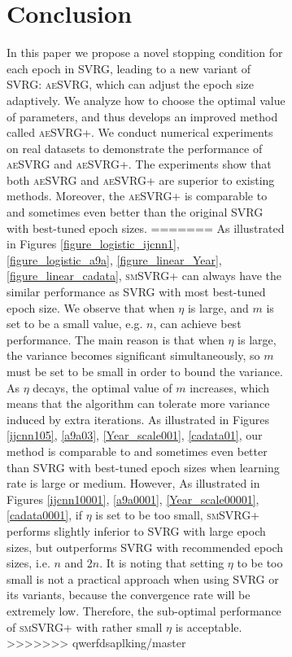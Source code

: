 \documentclass[conference]{IEEEtran}
\begin{document}
\begin{algorithm}[t]
\begin{itemize}
\begin{figure}[ht]
\begin{figure}[ht]
\section{Conclusion}
In this paper we propose a novel stopping condition for each epoch in SVRG, leading to a new variant of SVRG: \textsc{aeSVRG}, which can adjust the epoch size adaptively. We analyze how to choose the optimal value of parameters, and thus develops an improved method called \textsc{aeSVRG+}. We conduct numerical experiments on real datasets to demonstrate the performance of \textsc{aeSVRG} and \textsc{aeSVRG+}. The experiments show that both \textsc{aeSVRG} and \textsc{aeSVRG+} are superior to existing methods. Moreover, the \textsc{aeSVRG+} is comparable to and sometimes even better than the original SVRG with best-tuned epoch sizes.
=======
As illustrated in Figures \ref{figure_logistic_ijcnn1}, \ref{figure_logistic_a9a}, \ref{figure_linear_Year}, \ref{figure_linear_cadata},  \textsc{smSVRG+} can always have the similar performance as SVRG with most best-tuned epoch size. We observe that when $\eta$ is large,  and $m$ is set to be a small value, e.g. $n$, can achieve best performance. The main reason is that when $\eta$ is large, the variance becomes significant simultaneously, so $m$ must be set to be small in order to bound the variance. As $\eta$ decays, the optimal value of $m$ increases, which means that the algorithm can tolerate more variance induced by extra iterations. As illustrated in Figures \ref{ijcnn105}, \ref{a9a03}, \ref{Year_scale001}, \ref{cadata01}, our method is comparable to and sometimes even better than SVRG with best-tuned epoch sizes when learning rate is large or medium. However, As illustrated in Figures \ref{ijcnn10001}, \ref{a9a0001}, \ref{Year_scale00001}, \ref{cadata0001}, if $\eta$ is set to be too small, \textsc{smSVRG+} performs slightly inferior to  SVRG with large epoch sizes, but outperforms SVRG with recommended epoch sizes, i.e. $n$ and $2n$. It is noting that setting $\eta$ to be too small is not a practical approach when using SVRG or its variants, because the convergence rate will be extremely low. Therefore, the sub-optimal performance of \textsc{smSVRG+} with rather small $\eta$ is acceptable.
>>>>>>> qwerfdsaplking/master
 

\end{figure}
\end{figure}
\end{itemize}
\end{algorithm}
\end{document}
